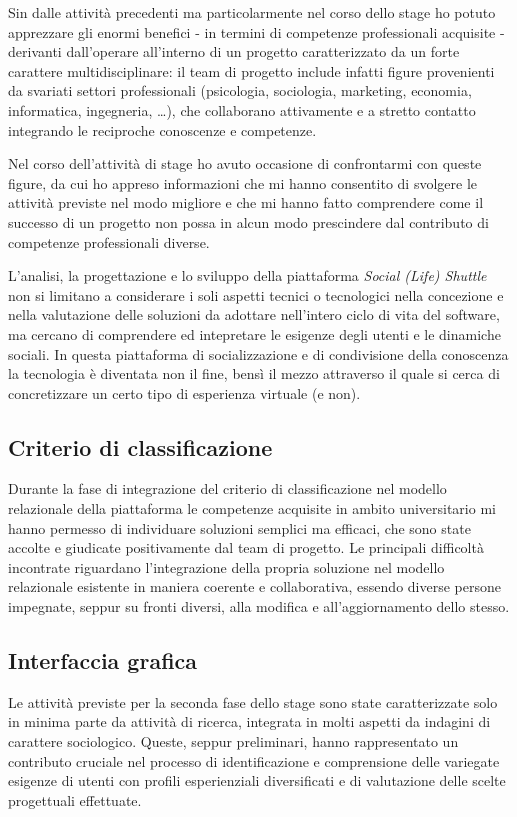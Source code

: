 Sin dalle attività precedenti ma particolarmente nel corso dello stage ho potuto apprezzare gli enormi benefici - in termini di competenze professionali acquisite - derivanti dall'operare all'interno di un progetto caratterizzato da un forte carattere multidisciplinare: il team di progetto include infatti figure provenienti da svariati settori professionali (psicologia, sociologia, marketing, economia, informatica, ingegneria, \ldots), che collaborano attivamente e a stretto contatto integrando le reciproche conoscenze e competenze.

Nel corso dell'attività di stage ho avuto occasione di confrontarmi con queste figure, da cui ho appreso informazioni che mi hanno consentito di svolgere le attività previste nel modo migliore e che mi hanno fatto comprendere come il successo di un progetto non possa in alcun modo prescindere dal contributo di competenze professionali diverse.

L'analisi, la progettazione e lo sviluppo della piattaforma \textit{Social (Life) Shuttle} non si limitano a considerare i soli aspetti tecnici o tecnologici nella concezione e nella valutazione delle soluzioni da adottare nell'intero ciclo di vita del software, ma cercano di comprendere ed intepretare le esigenze degli utenti e le dinamiche sociali. In questa piattaforma di socializzazione e di condivisione della conoscenza la tecnologia è diventata non il fine, bensì il mezzo attraverso il quale si cerca di concretizzare un certo tipo di esperienza virtuale (e non).

\subsection{Criterio di classificazione}

Durante la fase di integrazione del criterio di classificazione nel modello relazionale della piattaforma le competenze acquisite in ambito universitario mi hanno permesso di individuare soluzioni semplici ma efficaci, che sono state accolte e giudicate positivamente dal team di progetto. Le principali difficoltà incontrate riguardano l'integrazione della propria soluzione nel modello relazionale esistente in maniera coerente e collaborativa, essendo diverse persone impegnate, seppur su fronti diversi, alla modifica e all'aggiornamento dello stesso.

\subsection{Interfaccia grafica}
Le attività previste per la seconda fase dello stage sono state caratterizzate solo in minima parte da attività di ricerca, integrata in molti aspetti da indagini di carattere sociologico. Queste, seppur preliminari, hanno rappresentato un contributo cruciale nel processo di identificazione e comprensione delle variegate esigenze di utenti con profili esperienziali diversificati e di valutazione delle scelte progettuali effettuate.

